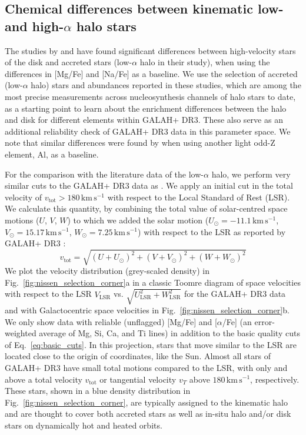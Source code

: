\documentclass[fleqn,usenatbib]{mnras}
\newcommand{\kms}{\,\mathrm{km\,s^{-1}}}	%
\begin{document}
\subsection{Chemical differences between kinematic low- and high-\texorpdfstring{$\alpha$}{alpha} halo stars} \label{sec:enrichment_differences}

The studies by \citet{Nissen2010,Nissen2011,Nissen2012} and \citet{Nissen2014} have found significant differences between high-velocity stars of the disk and accreted stars (low-$\alpha$ halo in their study), when using the differences in [Mg/Fe] and [Na/Fe] as a baseline. We use the selection of accreted (low-$\alpha$ halo) stars and abundances reported in these studies, which are among the most precise measurements across nucleosynthesis channels of halo stars to date, as a starting point to learn about the enrichment differences between the halo and disk for different elements within GALAH+ DR3. These also serve as an additional reliability check of GALAH+ DR3 data in this parameter space. We note that similar differences were found by \citet{Hawkins2015} when using another light odd-Z element, Al, as a baseline.

For the comparison with the literature data of the low-$\alpha$ halo, we perform very similar cuts to the GALAH+ DR3 data as \cite{Nissen2010}. We apply an initial cut in the total velocity of $v_\text{tot} > 180\kms$ with respect to the Local Standard of Rest (LSR). We calculate this quantity, by combining the total value of solar-centred space motions ($U$, $V$, $W$) to which we added the solar motion ($U_\odot = -11.1\kms$, $V_\odot = 15.17\kms$, $W_\odot = 7.25\kms$) with respect to the LSR as reported by GALAH+ DR3 \citep{Buder2021}:
\begin{equation}
v_\text{tot} = \sqrt{ \left(U + U_\odot \right)^2 + \left(V + V_\odot \right)^2 + \left(W + W_\odot \right)^2} \label{eq:total_velocity}
\end{equation}
We plot the velocity distribution (grey-scaled density) in Fig.~\ref{fig:nissen_selection_corner}a in a classic Toomre diagram of space velocities with respect to the LSR $V_\text{LSR}$ vs. $\sqrt{U_\text{LSR}^2 + W_\text{LSR}^2}$ for the GALAH+ DR3 data and with Galactocentric space velocities in Fig.~\ref{fig:nissen_selection_corner}b. We only show data with reliable (unflagged) [Mg/Fe] and [$\alpha$/Fe] (an error-weighted average of Mg, Si, Ca, and Ti lines) in addition to the basic quality cuts of Eq.~\ref{eq:basic_cuts}. In this projection, stars that move similar to the LSR are located close to the origin of coordinates, like the Sun. Almost all stars of GALAH+ DR3 have small total motions compared to the LSR, with only  and  above a total velocity $v_\text{tot}$ or tangential velocity $v_T$ above $180\kms$, respectively. These stars, shown in a blue density distribution in Fig.~\ref{fig:nissen_selection_corner}, are typically assigned to the kinematic halo \citep[e.g.][]{Venn2004} and are thought to cover both accreted stars as well as in-situ halo and/or disk stars on dynamically hot and heated orbits.
\end{document}
